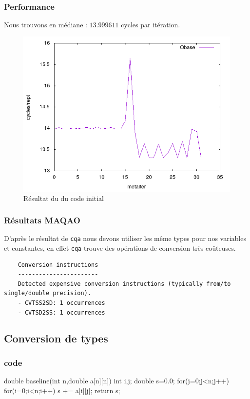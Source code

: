 \documentclass{report}
\begin{document}
  \subsubsection{Performance}
  Nous trouvons en médiane : $13.999611$ cycles par itération.
  \begin{figure}[ht!]
    \centering
    \includegraphics[scale=0.45]{../metarep/Obase.png}
    \caption{Résultat du du code initial}
  \end{figure}
  \subsubsection{Résultats MAQAO}
  D'après le résultat de \texttt{cqa} nous devons utiliser les même types pour nos variables et
  constantes, en effet \texttt{cqa} trouve des opérations de conversion très coûteuses.
  \begin{verbatim}
    Conversion instructions
    -----------------------
    Detected expensive conversion instructions (typically from/to single/double precision).
    - CVTSS2SD: 1 occurrences
    - CVTSD2SS: 1 occurrences
  \end{verbatim}
  \subsection{Conversion de types}
  \subsubsection{code}
  \begin{cc}
    double baseline(int n,double a[n][n])
    {
        int i,j;
        double s=0.0;
        for(j=0;j<n;j++)
            for(i=0;i<n;i++)
                s += a[i][j];
        return s;
    }
  \end{cc}
\end{document}
